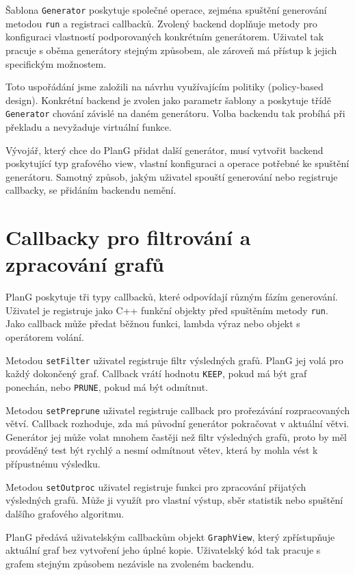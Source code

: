 Šablona \texttt{Generator} poskytuje společné operace, zejména spuštění
generování metodou \texttt{run} a registraci callbacků. Zvolený backend
doplňuje metody pro konfiguraci vlastností podporovaných konkrétním
generátorem. Uživatel tak pracuje s oběma generátory stejným způsobem, ale
zároveň má přístup k jejich specifickým možnostem.

Toto uspořádání jsme založili na návrhu využívajícím politiky (policy-based design).
Konkrétní backend je zvolen jako parametr šablony a poskytuje třídě 
\texttt{Generator} chování závislé na daném generátoru. Volba backendu tak 
probíhá při překladu a nevyžaduje virtuální funkce.

Vývojář, který chce do PlanG přidat další generátor, musí vytvořit backend
poskytující typ grafového view, vlastní konfiguraci a operace potřebné ke
spuštění generátoru. Samotný způsob, jakým uživatel spouští generování nebo
registruje callbacky, se přidáním backendu nemění.

\section{Callbacky pro filtrování a zpracování grafů}
\label{sec:design-callbacks}

PlanG poskytuje tři typy callbacků, které odpovídají různým fázím generování.
Uživatel je registruje jako C++ funkční objekty před spuštěním metody
\texttt{run}. Jako callback může předat běžnou funkci, lambda výraz nebo objekt
s operátorem volání.

Metodou \texttt{setFilter} uživatel registruje filtr výsledných grafů. PlanG
jej volá pro každý dokončený graf. Callback vrátí hodnotu \texttt{KEEP}, pokud
má být graf ponechán, nebo \texttt{PRUNE}, pokud má být odmítnut.

Metodou \texttt{setPreprune} uživatel registruje callback pro prořezávání
rozpracovaných větví. Callback rozhoduje, zda má původní generátor pokračovat
v aktuální větvi. Generátor jej může volat mnohem častěji než filtr výsledných
grafů, proto by měl prováděný test být rychlý a nesmí odmítnout větev, která by
mohla vést k přípustnému výsledku.

Metodou \texttt{setOutproc} uživatel registruje funkci pro zpracování přijatých
výsledných grafů. Může ji využít pro vlastní výstup, sběr statistik nebo
spuštění dalšího grafového algoritmu.

PlanG předává uživatelským callbackům objekt \texttt{GraphView}, který
zpřístupňuje aktuální graf bez vytvoření jeho úplné kopie. Uživatelský kód tak
pracuje s grafem stejným způsobem nezávisle na zvoleném backendu.

